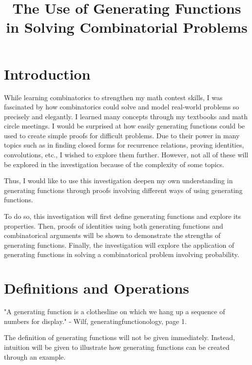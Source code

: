 \documentclass[12pt]{article}
\begin{document}
\doublespacing
\title{The Use of Generating Functions in Solving Combinatorial Problems}
\date{}
\maketitle
\begin{center}
\end{center}
\newpage
\tableofcontents
\newpage

\section{Introduction}
While learning combinatorics to strengthen my math contest skills, I was fascinated by how combinatorics could solve and model real-world problems so precisely and elegantly. I learned many concepts through my textbooks and math circle meetings. I would be surprised at how easily generating functions could be used to create simple proofs for difficult problems. Due to their power in many topics such as in finding closed forms for recurrence relations, proving identities, convolutions, etc., I wished to explore them further. However, not all of these will be explored in the investigation because of the complexity of some topics.

Thus, I would like to use this investigation deepen my own understanding in generating functions through proofs involving different ways of using generating functions.

To do so, this investigation will first define generating functions and explore its properties. Then, proofs of identities using both generating functions and combinatorical arguments will be shown to demonstrate the strengths of generating functions. Finally, the investigation will explore the application of generating functions in solving a combinatorical problem involving probability.
\section{Definitions and Operations}
"A generating function is a clothesline on which we hang up a sequence of numbers for display." - Wilf, generatingfunctionology, page 1.

The definition of generating functions will not be given immediately. Instead, intuition will be given to illustrate how generating functions can be created through an example.
\end{document}
